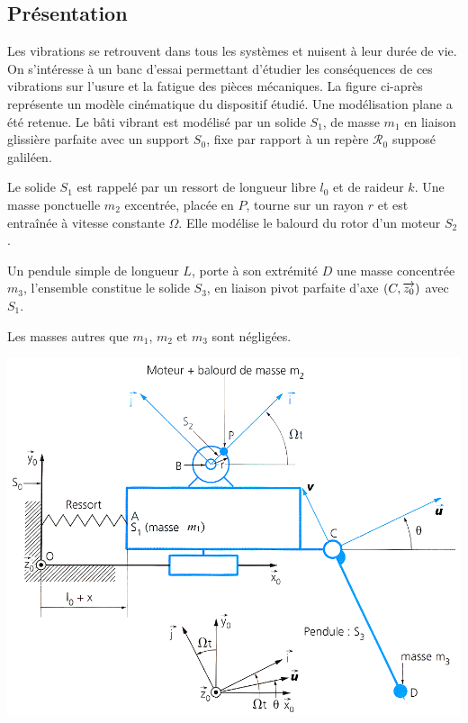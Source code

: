 \documentclass[10pt,fleqn]{article} %
\begin{document}
\def\pathfig{images}

\vspace{5cm}
\pagestyle{fancy}
\thispagestyle{plain}

\def\columnseprulecolor{\color{ocre}}
\setlength{\columnseprule}{0.4pt} 

\def\pathfig{images}

\ifprof
\else
\begin{multicols}{2}
\fi

\subsection*{Présentation}
Les vibrations se retrouvent dans tous les systèmes et nuisent à leur durée de vie. On s’intéresse à un banc d’essai permettant d’étudier les conséquences de ces vibrations sur l’usure et la fatigue des pièces mécaniques.
La figure ci-après représente un modèle cinématique du dispositif étudié. Une modélisation plane a été retenue.
Le bâti vibrant est modélisé par un solide $S_1$, de masse $m_1$ en liaison glissière parfaite avec un support $S_0$, fixe par rapport à un repère $\mathcal{R}_0$ supposé galiléen.

Le solide $S_1$ est rappelé par un ressort de longueur libre $l_0$ et de raideur $k$.
Une masse ponctuelle $m_2$ excentrée, placée en $P$, tourne sur un rayon $r$ et est entraînée à vitesse constante $\Omega$. Elle modélise le 
balourd du rotor d’un moteur $S_2$.

Un pendule simple de longueur $L$, porte à son extrémité $D$ une masse concentrée $m_3$, l’ensemble constitue le solide $S_3$, en liaison pivot parfaite d’axe $\left(C,\overrightarrow{z_0}\right)$ avec $S_1$.

Les masses autres que $m_1$, $m_2$ et $m_3$ sont négligées.



\begin{center}
\includegraphics[width=\linewidth]{images/fig_01}
\end{center}


\end{multicols}
\end{document}
